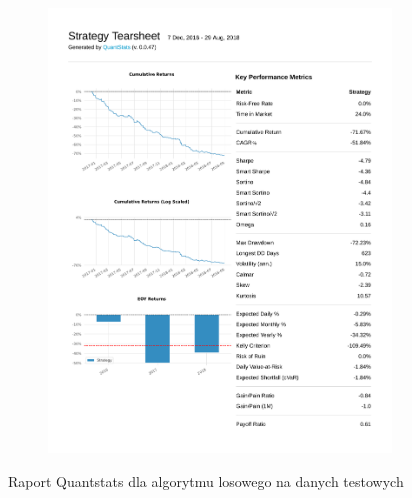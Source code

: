 \documentclass[12pt,a4paper]{article}
\begin{document}
\begin{figure}[ht!]
\begin{subfigure}[ht!]{0.45\textwidth}
    \includegraphics[page=3, width=\textwidth]{plots/qs_rand.pdf}
  \end{subfigure}
  \caption{Raport Quantstats dla algorytmu losowego na
    danych testowych}
\end{figure}
\end{document}
